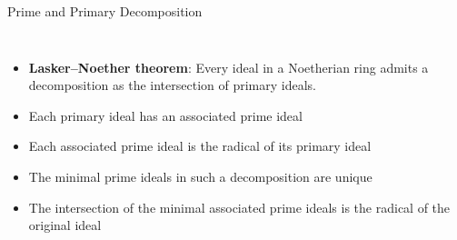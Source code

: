 \documentclass[11pt]{beamer}
\begin{document}
\begin{frame}{Prime and Primary Decomposition}
\begin{columns}
\begin{itemize}
  \item \textbf{Lasker–Noether theorem}: Every ideal in a Noetherian ring admits a decomposition as the intersection of primary ideals.
  \item Each primary ideal has an associated prime ideal
  \item Each associated prime ideal is the radical of its primary ideal
  \item The minimal prime ideals in such a decomposition are unique
  \item The intersection of the minimal associated prime ideals is the radical of the original ideal
\end{itemize}
\centering
\hspace*{-1in}
\end{columns}
\end{frame}
\end{document}
